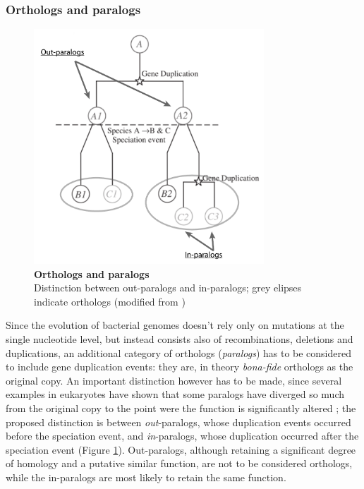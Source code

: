 \subsubsection{Orthologs and paralogs}
\begin{figure}[!tb]
	\center
    \includegraphics[width=0.77\textwidth]{figures/Introduction/thesis_5}
	\caption{\label{fig:orthologs}\textbf{Orthologs and paralogs}\\
			Distinction between out-paralogs and in-paralogs; grey elipses indicate orthologs (modified from \cite{o2005inparanoid})}
\end{figure}
Since the evolution of bacterial genomes doesn't rely only on mutations at the single nucleotide level, but instead consists also of recombinations, deletions and duplications, an additional category of orthologs (\textit{paralogs}) has to be considered to include gene duplication events: they are, in theory \textit{bona-fide} orthologs as the original copy. An important distinction however has to be made, since several examples in eukaryotes have shown that some paralogs have diverged so much from the original copy to the point were the function is significantly altered \cite{studer2009confident}\cite{nehrt2011testing}; the proposed distinction is between \textit{out}-paralogs, whose duplication events occurred before the speciation event, and \textit{in}-paralogs, whose duplication occurred after the speciation event \cite{remm2001automatic} (Figure \ref{fig:orthologs}). Out-paralogs, although retaining a significant degree of homology and a putative similar function, are not to be considered orthologs, while the in-paralogs are most likely to retain the same function.

